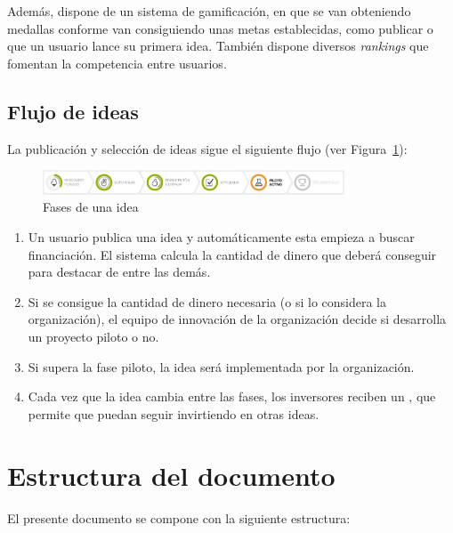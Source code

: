   Además, dispone de un sistema de gamificación, en que se van obteniendo medallas conforme van
  consiguiendo unas metas establecidas, como publicar o que un usuario lance su primera idea. También
   dispone diversos \textit{rankings} que fomentan la competencia entre usuarios.
   
 \subsection{Flujo de ideas}
 
 La publicación y selección de ideas sigue el siguiente flujo (ver Figura~\ref{fig:flujo}):
 
 \begin{figure}[!h]
 \begin{center}
 \includegraphics[width=0.8\textwidth]{./img/introduccion/flujo.png}
 \caption{Fases de una idea}
 \label{fig:flujo}
 \end{center}
 \end{figure}
 
 \begin{enumerate}
 	\item Un usuario publica una idea y automáticamente esta empieza a buscar financiación. El sistema calcula la cantidad de dinero que deberá conseguir para destacar de entre las demás.
 	\item Si se consigue la cantidad de dinero necesaria (o si lo considera la organización), el equipo de
 	 innovación de la organización decide si desarrolla un proyecto piloto o no.
 	 \item Si supera la fase piloto, la idea será implementada por la organización.
 	 \item Cada vez que la idea cambia entre las fases, los inversores reciben un , que permite
 	 que puedan seguir invirtiendo en otras ideas.
 \end{enumerate}
 
  
 
\section{Estructura del documento}

El presente documento se compone con la siguiente estructura:

